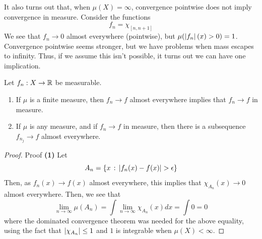It also turns out that, when $\mu(X) = \infty$, convergence pointwise does not imply convergence in measure. Consider the functions
\[ f_n = \chi_{[n, n + 1]} \]
We see that $f_n \to 0$ almost everywhere (pointwise), but $\mu(\left\lvert {f_n} \right\rvert(x) > 0) = 1$. Convergence pointwise seems stronger, but we have problems when mass escapes to infinity. Thus, if we assume this isn't possible, it turns out we can have one implication.

\begin{lemma}
    Let $f_n : X \to \mathbb{R}$ be measurable.
    \begin{enumerate}
        \item If $\mu$ is a finite measure, then $f_n \to f$ almost everywhere implies that $f_n \to f$ in measure.
        \item If $\mu$ is any measure, and if $f_n \to f$ in measure, then there is a subsequence $f_{n_{j}} \to f$ almost everywhere. 
    \end{enumerate}
\end{lemma}
\begin{proof}{Proof}
    \textbf{(1)} Let
    \[ A_n = \{x \, :\, \left\lvert {f_{n}(x) - f(x)} \right\rvert > \epsilon\} \]
    Then, as $f_n(x) \to f(x)$ almost everywhere, this implies that $\chi_{A_n}(x) \to 0$ almost everywhere. Then, we see that
    \[ \lim_{n \to \infty} \mu(A_n) = \int \lim_{n \to \infty} \chi_{A_n}(x) dx = \int 0 = 0 \]
    where the dominated convergence theorem was needed for the above equality, using the fact that $\left\lvert {\chi_{A_n}} \right\rvert \leq 1$ and $1$ is integrable when $\mu(X) < \infty$. 
\end{proof}